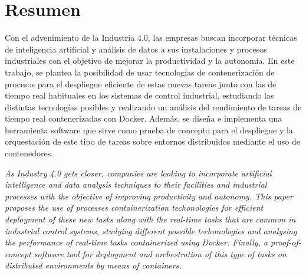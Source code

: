 
\chapter*{Resumen}

Con el advenimiento de la Industria 4.0, las empresas buscan incorporar técnicas
de inteligencia artificial y análisis de datos a sus instalaciones y procesos
industriales con el objetivo de mejorar la productividad y la autonomía. En este
trabajo, se plantea la posibilidad de usar tecnologías de contenerización de
procesos para el despliegue eficiente de estas nuevas tareas junto con las de
tiempo real habituales en los sistemas de control industrial, estudiando las
distintas tecnologías posibles y realizando un análisis del rendimiento de
tareas de tiempo real contenerizadas con Docker. Además, se diseña e implementa
una herramienta software que sirve como prueba de concepto para el despliegue y
la orquestación de este tipo de tareas sobre entornos distribuidos mediante el
uso de contenedores.

\itshape
As Industry 4.0 gets closer, companies are looking to incorporate artificial
intelligence and data analysis techniques to their facilities and industrial
processes with the objective of improving productivity and autonomy. This paper
proposes the use of processes containerization techonologies for efficient
deployment of these new tasks along with the real-time tasks that are common in
industrial control systems, studying different possible techonologies and
analysing the performance of real-time tasks containerized using Docker.
Finally, a proof-of-concept software tool for deployment and orchestration of
this type of tasks on distributed environments by means of containers.


\cleardoublepage